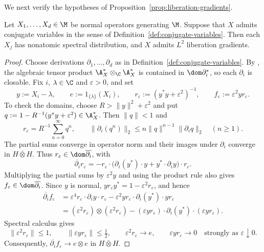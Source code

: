 We next verify the hypotheses of Proposition~\ref{prop:liberation-gradients}.
\begin{lemma}\label{lem:conjugate-liberation}
Let $X_1,\ldots,X_d\in\M$ be normal operators generating $\M$.
Suppose that $X$ admits conjugate variables in the sense of Definition~\ref{def:conjugate-variables}.
Then each $X_j$ has nonatomic spectral distribution, and $X$ admits $L^2$ liberation gradients.
\end{lemma}
\begin{proof}
Choose derivations $\partial_1,\ldots,\partial_d$ as in Definition~\ref{def:conjugate-variables}.
By \cite[Lemma~3.3]{ACSY24}, the algebraic tensor product $\A_X^\ast\otimes_{\C}\A_X^\ast$ is contained in $\dom\partial_i^*$, so each $\partial_i$ is closable.
Fix $i$, $\lambda\in\C$ and $\varepsilon>0$, and set
\[
 y:=X_i-\lambda,\qquad e:=1_{\{\lambda\}}(X_i),\qquad
 r_\varepsilon:=(y^*y+\varepsilon^2)^{-1},\qquad
 f_\varepsilon:=\varepsilon^2yr_\varepsilon.
\]
To check the domains, choose $R>\|y\|^2+\varepsilon^2$ and put $q:=1-R^{-1}(y^*y+\varepsilon^2)\in\A_X^\ast$.
Then $\|q\|<1$ and
\[
 r_\varepsilon=R^{-1}\sum_{n=0}^\infty q^n,\qquad
 \|\partial_i(q^n)\|_2
 \leq n\|q\|^{n-1}\|\partial_i q\|_2
 \quad(n\geq1).
\]
The partial sums converge in operator norm and their images under $\partial_i$ converge in $H\bar\otimes H$.
Thus $r_\varepsilon\in\dom\overline{\partial_i}$, with
\[
 \overline{\partial_i}r_\varepsilon
 =-r_\varepsilon\cdot
   \bigl(\partial_i(y^*)\cdot y+y^*\cdot\partial_i y\bigr)
   \cdot r_\varepsilon.
\]
Multiplying the partial sums by $\varepsilon^2y$ and using the product rule also gives $f_\varepsilon\in\dom\overline{\partial_i}$.
Since $y$ is normal, $yr_\varepsilon y^*=1-\varepsilon^2r_\varepsilon$, and hence
\begin{align*}
 \overline{\partial_i}f_\varepsilon
 &=\varepsilon^4r_\varepsilon\cdot\partial_i y\cdot r_\varepsilon
   -\varepsilon^2yr_\varepsilon\cdot\partial_i(y^*)\cdot yr_\varepsilon\\
 &=(\varepsilon^2r_\varepsilon)\otimes(\varepsilon^2r_\varepsilon)
   -(\varepsilon yr_\varepsilon)\cdot\partial_i(y^*)
     \cdot(\varepsilon yr_\varepsilon).
\end{align*}
Spectral calculus gives
\[
 \|\varepsilon^2r_\varepsilon\|\leq1,\qquad
 \|\varepsilon yr_\varepsilon\|\leq\tfrac12,\qquad
 \varepsilon^2r_\varepsilon\longrightarrow e,\qquad
 \varepsilon yr_\varepsilon\longrightarrow0
 \quad\text{strongly as }\varepsilon\downarrow0.
\]
Consequently, $\overline{\partial_i}f_\varepsilon\to e\otimes e$ in $H\bar\otimes H$.

\end{proof}
